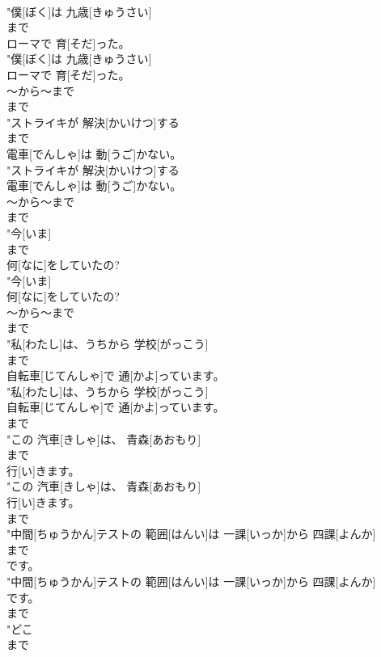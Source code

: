 \documentclass[8pt]{extreport}
\begin{document}
\begin{CJK}{UTF8}{min}
\\	"僕[ぼく]は 九歳[きゅうさい]
\\	まで
\\	ローマで 育[そだ]った。
\\	"僕[ぼく]は 九歳[きゅうさい]
\\	ローマで 育[そだ]った。
\\	～から～まで	
\\	まで
\\	"ストライキが 解決[かいけつ]する
\\	まで
\\	電車[でんしゃ]は 動[うご]かない。
\\	"ストライキが 解決[かいけつ]する
\\	電車[でんしゃ]は 動[うご]かない。
\\	～から～まで	
\\	まで
\\	"今[いま]
\\	まで
\\	何[なに]をしていたの?
\\	"今[いま]
\\	何[なに]をしていたの?
\\	～から～まで	
\\	まで
\\	"私[わたし]は、うちから 学校[がっこう]
\\	まで
\\	自転車[じてんしゃ]で 通[かよ]っています。
\\	"私[わたし]は、うちから 学校[がっこう]
\\	自転車[じてんしゃ]で 通[かよ]っています。
\\	まで
\\	"この 汽車[きしゃ]は、 青森[あおもり]
\\	まで
\\	行[い]きます。
\\	"この 汽車[きしゃ]は、 青森[あおもり]
\\	行[い]きます。
\\	まで
\\	"中間[ちゅうかん]テストの 範囲[はんい]は 一課[いっか]から 四課[よんか]
\\	まで
\\	です。
\\	"中間[ちゅうかん]テストの 範囲[はんい]は 一課[いっか]から 四課[よんか]
\\	です。
\\	まで
\\	"どこ
\\	まで

\end{CJK}
\end{document}
